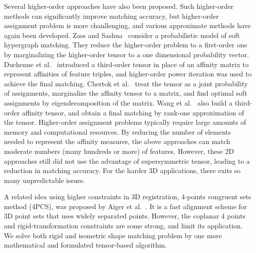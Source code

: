 Several higher-order approaches have also been proposed.
Such higher-order methods can significantly improve matching accuracy,
but higher-order assignment problem is more chanllenging, and various approximate methods have again been developed.
Zass and Sashua~\cite{Zass08} consider a probabilistic model of soft hypergraph matching.
They reduce the higher-order problem to a first-order one by marginalizing the higher-order tensor to a one dimensional probability vector.
Duchenne et al.~\cite{Duchenne_etal09} introduced a third-order tensor in place of an affinity matrix to represent affinities of feature triples,
and higher-order power iteration was used to achieve the final matching.
Chertok et al.~\cite{Chertok10} treat the tensor as a joint probability of assignments, marginalize the affinity tensor to a matrix,
and find optimal soft assignments by eigendecomposition of the matrix.
Wang et al.~\cite{Aiping10} also build a third-order affinity tensor, and obtain a final matching by rank-one approximation of the tensor.
Higher-order assignment problems typically require large amounts of memory and computational resources.
By reducing the number of elements needed to represent the affinity measures,
the above approaches can match moderate numbers (many hundreds or more) of features.
However, these 2D approaches still did not use the advantage of supersymmetric tensor, leading to a reduction in matching accuracy.
For the harder 3D applications, there exits so many unpredictable issues.

A related idea using higher constraints in 3D registration, 4-points congruent sets method (4PCS), was proposed by Aiger et al.~\cite{Aiger08}.
It is a fast alignment scheme for 3D point sets that uses widely separated points.
However, the coplanar 4 points and rigid-transformation constraints are some strong, and limit its application.
We solve both rigid and isometric shape matching problem by one more mathematical and formulated tensor-based algorithm.
